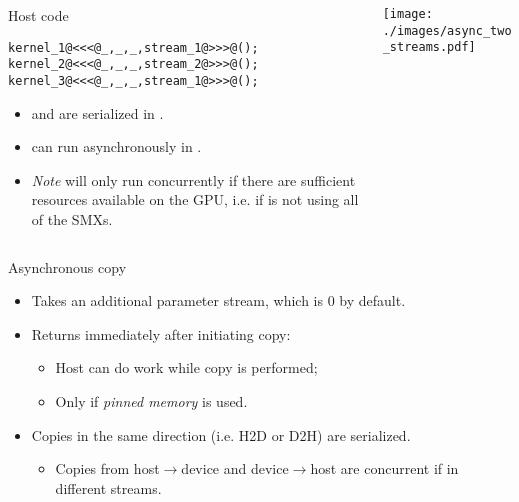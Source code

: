 \documentclass[aspectratio=43]{beamer}
\begin{document}
\begin{frame}[fragile]{}
    \begin{columns}[T]
        \begin{column}{0.45\textwidth}
            \begin{codecolumn}{Host code}
                \begin{lstlisting}[style=boxcudatiny]
kernel_1@<<<@_,_,_,stream_1@>>>@();
kernel_2@<<<@_,_,_,stream_2@>>>@();
kernel_3@<<<@_,_,_,stream_1@>>>@();
                \end{lstlisting}
            \end{codecolumn}
            \begin{itemize}
                \item \footnotesize {} and  are serialized in .
                \item {} can run asynchronously in .
                \item \emph{Note}  will only run concurrently if there are sufficient resources available on the GPU, i.e. if  is not using all of the SMXs.
            \end{itemize}
        \end{column}
        \begin{column}{0.6\textwidth}
            \texttt{[image: ./images/async\_two\_streams.pdf]}
        \end{column}
    \end{columns}
\end{frame}

\begin{frame}[fragile]{Asynchronous copy}

    \centering {}
    \begin{itemize}
        \item Takes an additional parameter stream, which is 0 by default.
        \item Returns immediately after initiating copy:
        \begin{itemize}
            \item Host can do work while copy is performed;
            \item Only if \emph{pinned memory} is used.
        \end{itemize}
        \item Copies in the same direction (i.e. H2D or D2H) are serialized.
        \begin{itemize}
            \item Copies from host$\rightarrow$device and device$\rightarrow$host are concurrent if in different streams.
        \end{itemize}
    \end{itemize}

\end{frame}
\end{document}
